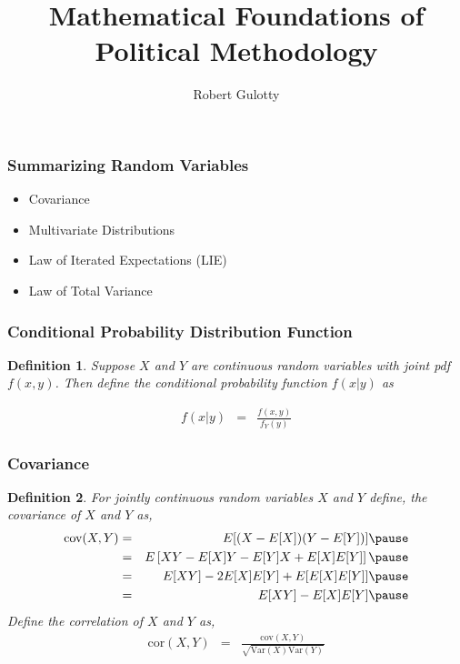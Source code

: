 \documentclass[handout]{beamer}
\title[PLSC 43401]{Mathematical Foundations of Political Methodology}
\author{Robert Gulotty}
\institute[Chicago]{University of Chicago}
\newtheorem{defn}{Definition}
\numberwithin{equation}{section}
\begin{document}
\begin{frame}
\maketitle
\end{frame}


\begin{frame}
\frametitle{Summarizing Random Variables}

\begin{itemize}
\item Covariance
\item Multivariate Distributions
\item Law of Iterated Expectations (LIE)
\item Law of Total Variance
\end{itemize}
\end{frame}




\begin{frame}
\frametitle{Conditional Probability Distribution Function}


\begin{defn}
Suppose $X$ and $Y$ are continuous random variables with joint pdf $f(x,y)$.  Then define the \alert{conditional probability function} $f(x|y)$ as 

\begin{eqnarray}
f(x|y) & = & \frac{f(x, y) }{f_{Y}(y) } \nonumber 
\end{eqnarray}

\end{defn}




\end{frame}

\begin{frame}
\frametitle{Covariance} 

\begin{defn} 
For jointly continuous random variables $X$ and $Y$ define, the covariance of $X$ and $Y$ as,\pause 
\begin{eqnarray}
\text{cov}(X,Y) & = & E[(X-E[X])(Y- E[Y])] \nonumber \pause  \\
& = & E\left[ XY - E[X] Y - E[Y] X + E[X]E[Y] \right] \nonumber \pause  \\
& = & E[XY] - 2E[X]E[Y] + E[E[X]E[Y]] \nonumber  \pause \\
& = & E[XY] - E[X]E[Y] \nonumber  \pause 
\end{eqnarray}
Define the correlation of $X$ and $Y$ as,  \pause 
\begin{eqnarray}
\text{cor}(X,Y) & =&  \frac{\text{cov}(X,Y) }{\sqrt{\text{Var}(X) \text{Var}(Y) } } \nonumber  
\end{eqnarray}
\end{defn} 

\end{frame}
\end{document}
